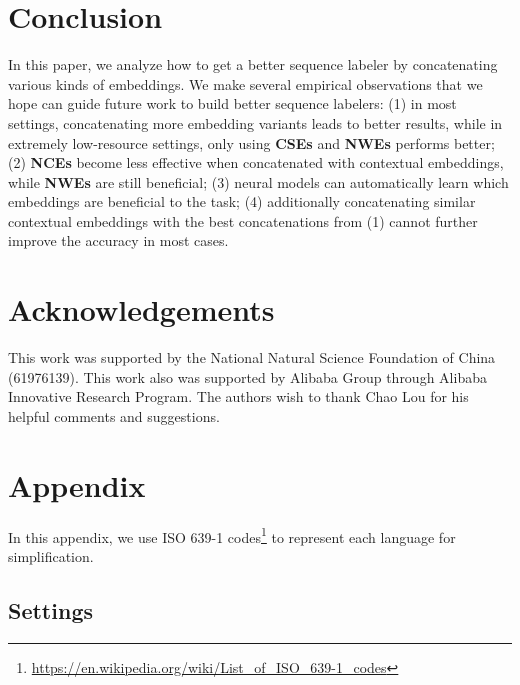 \documentclass[11pt,a4paper]{article}
\begin{document}
\section{Conclusion}
In this paper, we analyze how to get a better sequence labeler by concatenating various kinds of embeddings. We make several empirical observations that we hope can guide future work to build better sequence labelers: 
(1) in most settings, concatenating more embedding variants leads to better results, while in extremely low-resource settings, only using \textbf{CSEs} and \textbf{NWEs} performs better; (2) \textbf{NCEs} become less effective when concatenated with contextual embeddings, while \textbf{NWEs} are still beneficial; (3) neural models can automatically learn which embeddings are beneficial to the task; (4) additionally concatenating similar contextual embeddings with the best concatenations from (1) cannot further improve the accuracy in most cases.

\section*{Acknowledgements}
This work was supported by the National Natural Science Foundation of China (61976139). This work also was supported by Alibaba Group through Alibaba Innovative Research Program. 
The authors wish to thank Chao Lou for his helpful comments and suggestions. 








\appendix

\section{Appendix}
In this appendix, we use ISO 639-1 codes\footnote{\url{https://en.wikipedia.org/wiki/List_of_ISO_639-1_codes}} to represent each language for simplification.
\subsection{Settings}
\end{document}
